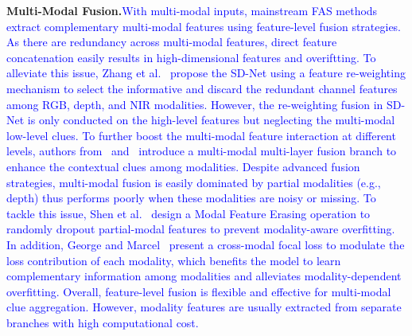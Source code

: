 \documentclass[10pt,journal,compsoc]{IEEEtran}
\begin{document}
\noindent\textbf{Multi-Modal Fusion.}\quad \textcolor{blue}{With multi-modal inputs, mainstream FAS methods extract complementary multi-modal features using feature-level fusion strategies. 
As there are redundancy across multi-modal features, direct feature concatenation easily results in high-dimensional features and overiftting. To alleviate this issue, Zhang et al.~\cite{zhang2020casia} propose the SD-Net using a feature re-weighting mechanism to select the informative and discard the redundant channel features among RGB, depth, and NIR modalities. However, the re-weighting fusion in SD-Net is only conducted on the high-level features but neglecting the multi-modal low-level clues. To further boost the multi-modal feature interaction at different levels, authors from~\cite{parkin2019recognizing} and~\cite{kuang2019multi} introduce a multi-modal multi-layer fusion branch to enhance the contextual clues among modalities. Despite advanced fusion strategies, multi-modal fusion is easily dominated by partial modalities (e.g., depth) thus performs poorly when these modalities are noisy or missing. To tackle this issue, Shen et al.~\cite{shen2019facebagnet} design a Modal Feature Erasing operation to randomly dropout partial-modal features to prevent modality-aware overfitting. In addition, George and Marcel~\cite{george2021cross} present a cross-modal focal loss to modulate the loss contribution of each modality, which benefits the model to learn complementary information among modalities and alleviates modality-dependent overfitting. Overall, feature-level fusion is flexible and effective for multi-modal clue aggregation. However, modality features are usually extracted from separate branches with high computational cost. }
\end{document}
